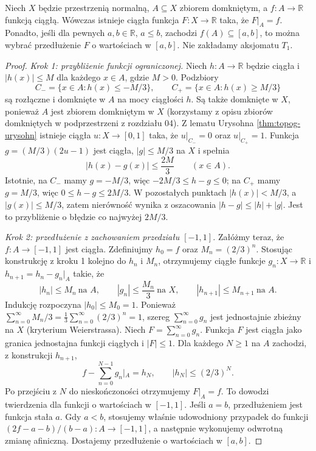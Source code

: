 \begin{twierdzenie}
\label{thm:topog-tietze}
Niech $X$ będzie przestrzenią normalną, $A\subseteq X$
zbiorem domkniętym, a $f\colon A\to\mathbb R$ funkcją ciągłą.
Wówczas istnieje ciągła funkcja $F\colon X\to\mathbb R$
taka, że $F|_A=f$. Ponadto, jeśli dla pewnych
$a,b\in\mathbb R$, $a\le b$, zachodzi $f(A)\subseteq[a,b]$,
to można wybrać przedłużenie $F$ o wartościach w $[a,b]$.
Nie zakładamy aksjomatu $T_1$.
\end{twierdzenie}
\begin{proof}
\emph{Krok 1: przybliżenie funkcji ograniczonej.}
Niech $h\colon A\to\mathbb R$ będzie ciągła i
$|h(x)|\le M$ dla każdego $x\in A$, gdzie $M>0$.
Podzbiory
\[
C_- = \{x\in A:h(x)\le -M/3\},\qquad
C_+ = \{x\in A:h(x)\ge M/3\}
\]
są rozłączne i domknięte w $A$ na mocy ciągłości $h$.
Są także domknięte w $X$, ponieważ $A$ jest
zbiorem domkniętym w $X$ (korzystamy z opisu zbiorów
domkniętych w podprzestrzeni z rozdziału 04).
Z lematu Urysohna \ref{thm:topog-urysohn} istnieje
ciągła $u\colon X\to[0,1]$ taka, że $u|_{C_-}=0$
oraz $u|_{C_+}=1$. Funkcja
$g=(M/3)(2u-1)$ jest ciągła, $|g|\le M/3$ na $X$
i spełnia
\[
|h(x)-g(x)|\le \frac{2M}{3}\qquad(x\in A).
\]
Istotnie, na $C_-$ mamy $g=-M/3$, więc
$-2M/3\le h-g\le 0$; na $C_+$ mamy $g=M/3$,
więc $0\le h-g\le 2M/3$. W pozostałych punktach
$|h(x)|<M/3$, a $|g(x)|\le M/3$, zatem
nierówność wynika z oszacowania
$|h-g|\le|h|+|g|$. Jest to przybliżenie o błędzie
co najwyżej $2M/3$.

\emph{Krok 2: przedłużenie z zachowaniem przedziału $[-1,1]$.}
Załóżmy teraz, że $f\colon A\to[-1,1]$ jest ciągła.
Zdefiniujmy $h_0=f$ oraz $M_n=(2/3)^n$.
Stosując konstrukcję z kroku 1 kolejno do $h_n$
i $M_n$, otrzymujemy ciągłe funkcje
$g_n\colon X\to\mathbb R$ i
$h_{n+1}=h_n-g_n|_A$ takie, że
\[
|h_n|\le M_n\ \text{na }A,\qquad
|g_n|\le\frac{M_n}{3}\ \text{na }X,\qquad
|h_{n+1}|\le M_{n+1}\ \text{na }A.
\]
Indukcję rozpoczyna $|h_0|\le M_0=1$.
Ponieważ
$\sum_{n=0}^{\infty} M_n/3
=\frac13\sum_{n=0}^{\infty}(2/3)^n=1$,
szereg $\sum_{n=0}^{\infty}g_n$ jest jednostajnie
zbieżny na $X$ (kryterium Weierstrassa).
Niech $F=\sum_{n=0}^{\infty}g_n$.
Funkcja $F$ jest ciągła jako granica jednostajna
funkcji ciągłych i $|F|\le1$. Dla każdego $N\ge1$
na $A$ zachodzi, z konstrukcji $h_{n+1}$,
\[
f-\sum_{n=0}^{N-1}g_n|_A=h_N,\qquad
|h_N|\le(2/3)^N.
\]
Po przejściu z $N$ do nieskończoności otrzymujemy
$F|_A=f$. To dowodzi twierdzenia dla funkcji
o wartościach w $[-1,1]$. Jeśli $a=b$, przedłużeniem
jest funkcja stała $a$. Gdy $a<b$, stosujemy właśnie
udowodniony przypadek do funkcji
$(2f-a-b)/(b-a)\colon A\to[-1,1]$,
a następnie wykonujemy odwrotną zmianę afiniczną.
Dostajemy przedłużenie o wartościach w $[a,b]$.


\end{proof}
